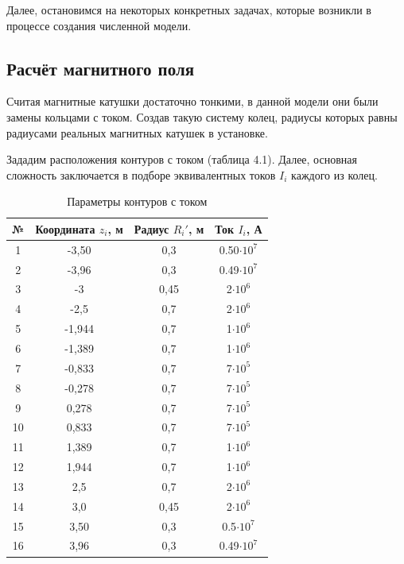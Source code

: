 Далее, остановимся на некоторых конкретных задачах, которые возникли в процессе создания численной модели.

\subsection{Расчёт магнитного поля}

Считая магнитные катушки достаточно тонкими, в данной модели они были замены кольцами с током. Создав такую систему колец, радиусы которых равны радиусами реальных магнитных катушек в установке. 

Зададим расположения контуров с током (таблица 4.1).
Далее, основная сложность заключается в подборе эквивалентных токов $I_i$ каждого из колец.

\begin{table}[h!]
	\center
	\parbox{10.7cm}{
		\caption{Параметры контуров с током}
	}
	\begin{tabular}{c|c|c|c}\label{tab:currents}
		№  & Координата $z_i$, м & Радиус $R_i'$, м & Ток $I_i$, А  \\ \hline \hline
		1  & -3,50  & 0,3  & 0.50$\cdot10^7$ \\
		2  & -3,96  & 0,3  & 0.49$\cdot10^7$ \\
		3  & -3     & 0,45 & 2$\cdot10^6$ \\
		4  & -2,5   & 0,7  & 2$\cdot10^6$ \\ 
		5  & -1,944 & 0,7  & 1$\cdot10^6$ \\ 
		6  & -1,389 & 0,7  & 1$\cdot10^6$ \\
		7  & -0,833 & 0,7  & 7$\cdot10^5$ \\
		8  & -0,278 & 0,7  & 7$\cdot10^5$ \\ 
		9  & 0,278  & 0,7  & 7$\cdot10^5$ \\ 
		10 & 0,833  & 0,7  & 7$\cdot10^5$ \\ 
		11 & 1,389  & 0,7  & 1$\cdot10^6$ \\ 
		12 & 1,944  & 0,7  & 1$\cdot10^6$ \\
		13 & 2,5    & 0,7  & 2$\cdot10^6$ \\
		14 & 3,0    & 0,45 & 2$\cdot10^6$ \\
		15 & 3,50   & 0,3  & 0.5$\cdot10^7$ \\
		16 & 3,96   & 0,3  & 0.49$\cdot10^7$ \\
	\end{tabular}
	\label{tab:prm}
\end{table} 

